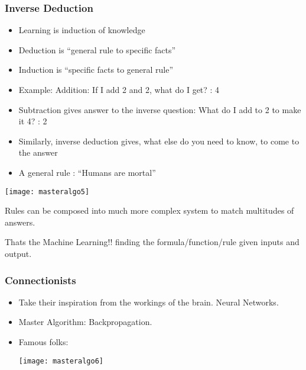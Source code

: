 \begin{frame}[fragile]\frametitle{Inverse Deduction}
  \begin{itemize}
    \item Learning is induction of knowledge
	\item Deduction is ``general rule to specific facts''
	\item Induction is ``specific facts to general rule''
	\item Example: Addition: If I add 2 and 2, what do I get? : 4
	\item Subtraction gives answer to the inverse question: What do I add to 2 to make it 4? : 2
	\item Similarly, inverse deduction gives, what else do you need to know, to come to the answer
	\item  A general rule : ``Humans are mortal''
  \end{itemize}
  
\begin{center}
\texttt{[image: masteralgo5]}
\end{center}

Rules can be composed into much more complex system to match multitudes of answers.

Thats the Machine Learning!! finding the formula/function/rule given inputs and output.
  
\end{frame}

\begin{frame}[fragile]\frametitle{Connectionists}
  \begin{itemize}
    \item Take their inspiration from the workings of the brain. Neural Networks.
	\item Master Algorithm: Backpropagation.
	\item Famous folks:
	
	 \begin{center}
\texttt{[image: masteralgo6]}
\end{center}
	
  \end{itemize}


\end{frame}


